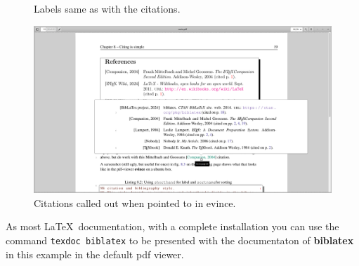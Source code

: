\begin{figure}
  \caption{\label{fig:fontysharvard}Labels same as with the citations.}
\end{figure}


\begin{figure}
   \centering \includegraphics[width=\linewidth]{images/activecitation.png}
  \caption{\label{fig:activecitation}Citations called out when pointed to in evince.}
\end{figure}

As most \LaTeX\ documentation, with a complete installation you can use the command \texttt{texdoc biblatex} to be presented with the
documentaton of \textbf{biblatex} in this example in the default pdf viewer.


